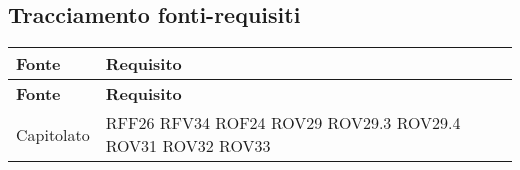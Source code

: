 \subsection{Tracciamento fonti-requisiti}
\def\arraystretch{1.5}
\begin{longtable}{p{2.5cm}!{\VRule[1pt]}p{2.5cm}}
	\color{white} \textbf{Fonte} & \color{white} \textbf{Requisito} \\ 
	\endfirsthead 
	\color{white} \textbf{Fonte} & \color{white} \textbf{Requisito} \\ 
	\endhead
	Capitolato & RFF26 \newline RFV34 \newline ROF24 \newline ROV29 \newline ROV29.3 \newline ROV29.4 \newline ROV31 \newline ROV32 \newline ROV33\\

\end{longtable}
